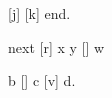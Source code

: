 \documentclass{article}
\begin{document}
 [j]   [k] end.

 next 
[r]  x  y [] w

 b [] c [v] d.
\end{document}
